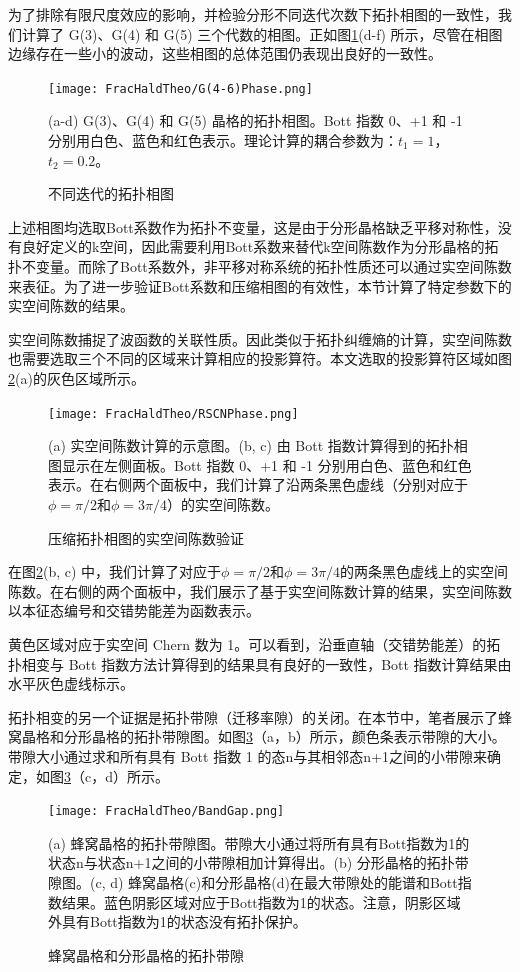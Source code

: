 为了排除有限尺度效应的影响，并检验分形不同迭代次数下拓扑相图的一致性，我们计算了 G(3)、G(4) 和 G(5) 三个代数的相图。正如图\ref{fig:G(4-6)Phase}(d-f) 所示，尽管在相图边缘存在一些小的波动，这些相图的总体范围仍表现出良好的一致性。

\begin{figure}[htbp]
    \centering
    \texttt{[image: FracHaldTheo/G(4-6)Phase.png]}
    \caption{不同迭代的拓扑相图}(a-d) G(3)、G(4) 和 G(5) 晶格的拓扑相图。Bott 指数 0、+1 和 -1 分别用白色、蓝色和红色表示。理论计算的耦合参数为：$t_1 = 1$，$t_2 = 0.2$。
    \label{fig:G(4-6)Phase}
\end{figure}

上述相图均选取Bott系数作为拓扑不变量，这是由于分形晶格缺乏平移对称性，没有良好定义的k空间，因此需要利用Bott系数来替代k空间陈数作为分形晶格的拓扑不变量。而除了Bott系数外，非平移对称系统的拓扑性质还可以通过实空间陈数来表征。为了进一步验证Bott系数和压缩相图的有效性，本节计算了特定参数下的实空间陈数的结果。

实空间陈数捕捉了波函数的关联性质。因此类似于拓扑纠缠熵的计算，实空间陈数也需要选取三个不同的区域来计算相应的投影算符。本文选取的投影算符区域如图\ref{fig:RSCNPhase}(a)的灰色区域所示。 

\begin{figure}[htbp]
    \centering
    \texttt{[image: FracHaldTheo/RSCNPhase.png]}
    \caption{压缩拓扑相图的实空间陈数验证}(a) 实空间陈数计算的示意图。(b, c) 由 Bott 指数计算得到的拓扑相图显示在左侧面板。Bott 指数 0、+1 和 -1 分别用白色、蓝色和红色表示。在右侧两个面板中，我们计算了沿两条黑色虚线（分别对应于$\phi=\pi/2$和$\phi=3\pi/4$）的实空间陈数。
    \label{fig:RSCNPhase}
\end{figure}

在图\ref{fig:RSCNPhase}(b, c) 中，我们计算了对应于$\phi=\pi/2$和$\phi=3\pi/4$的两条黑色虚线上的实空间陈数。在右侧的两个面板中，我们展示了基于实空间陈数计算的结果，实空间陈数以本征态编号和交错势能差为函数表示。

黄色区域对应于实空间 Chern 数为 1。可以看到，沿垂直轴（交错势能差）的拓扑相变与 Bott 指数方法计算得到的结果具有良好的一致性，Bott 指数计算结果由水平灰色虚线标示。

拓扑相变的另一个证据是拓扑带隙（迁移率隙）的关闭。在本节中，笔者展示了蜂窝晶格和分形晶格的拓扑带隙图。如图\ref{fig:BandGap}（a，b）所示，颜色条表示带隙的大小。带隙大小通过求和所有具有 Bott 指数 1 的态n与其相邻态n+1之间的小带隙来确定，如图\ref{fig:BandGap}（c，d）所示。

\begin{figure}[htbp]
    \centering
    \texttt{[image: FracHaldTheo/BandGap.png]}
    \caption{蜂窝晶格和分形晶格的拓扑带隙}(a) 蜂窝晶格的拓扑带隙图。带隙大小通过将所有具有Bott指数为1的状态n与状态n+1之间的小带隙相加计算得出。(b) 分形晶格的拓扑带隙图。(c, d) 蜂窝晶格(c)和分形晶格(d)在最大带隙处的能谱和Bott指数结果。蓝色阴影区域对应于Bott指数为1的状态。注意，阴影区域外具有Bott指数为1的状态没有拓扑保护。
    \label{fig:BandGap}
\end{figure}

